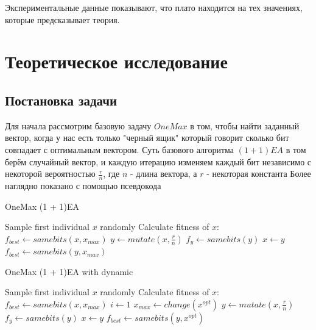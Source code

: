 \documentclass[times]{itmo-student-thesis}
\begin{document}
    Экспериментальные данные показывают, что плато находится на тех значениях, которые предсказывает теория.

    \chapter{Теоретическое исследование}

    \section{Постановка задачи}

    Для начала рассмотрим базовую задачу $OneMax$ в том, чтобы найти заданный вектор, когда у нас есть только "черный ящик" который говорит сколько бит совпадает с оптимальным вектором.
    Суть базового алгоритма $(1 + 1)EA$ в том берём случайный вектор, и каждую итерацию изменяем каждый бит независимо с некоторой вероятностью $\frac{r}{n}$, где $n$ - длина вектора, а $r$ - некоторая константа
    Более наглядно показано с помощью псевдокода
    \begin{algorithm}
        \caption{OneMax (1 + 1)EA}\label{alg:Example}
        \begin{algorithmic}[1]
            \State Sample first individual $x$ randomly
            \State Calculate fitness of $x$: $f_{best} \leftarrow samebits(x, x_{max})$
                \State $y \leftarrow mutate(x, \frac{r}{n})$
                \State $f_y \leftarrow samebits(y)$
                    \State $x \leftarrow y$
                    \State $f_{best} \leftarrow samebits(y, x_{max})$
                \EndIf
            \EndWhile
        \end{algorithmic}
    \end{algorithm}
    \begin{algorithm}
        \caption{OneMax (1 + 1)EA with dynamic}\label{alg:Example2}
        \begin{algorithmic}[1]

            \State Sample first individual $x$ randomly
            \State Calculate fitness of $x$: $f_{best} \leftarrow samebits(x, x_{max})$
            \State $i \leftarrow 1$
                    \State $x_{max} \leftarrow change(x^{opt})$
                \EndIf
                \State $y \leftarrow mutate(x, \frac{r}{n})$
                \State $f_y \leftarrow samebits(y)$
                    \State $x \leftarrow y$
                    \State $f_{best} \leftarrow samebits(y, x^{opt})$
                \EndIf
            \EndWhile

        \end{algorithmic}
    \end{algorithm}
\end{document}
